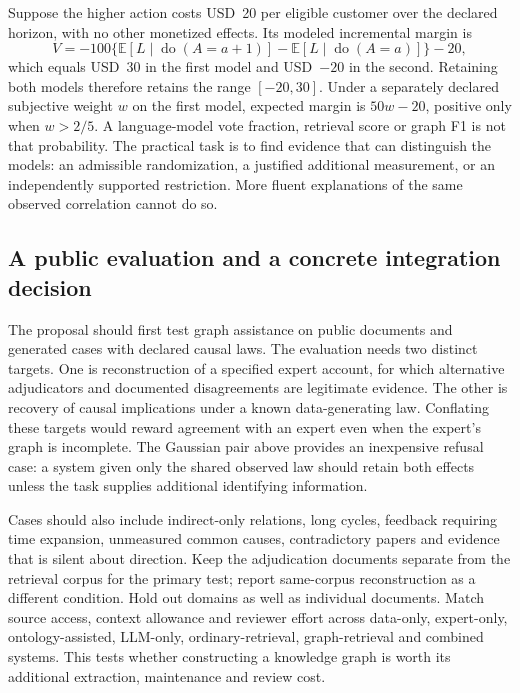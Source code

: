 Suppose the higher action costs USD~20 per eligible customer over the declared
horizon, with no other monetized effects. Its modeled incremental margin is
\begin{equation}
 V=-100\{\mathbb E[L\mid\operatorname{do}(A=a+1)]
             -\mathbb E[L\mid\operatorname{do}(A=a)]\}-20,
 \label{exec22:domain-margin}
\end{equation}
which equals USD~30 in the first model and USD~\(-20\) in the second. Retaining
both models therefore retains the range \([-20,30]\). Under a separately declared
subjective weight \(w\) on the first model, expected margin is \(50w-20\),
positive only when \(w>2/5\). A language-model vote fraction, retrieval score or
graph F1 is not that probability. The practical task is to find evidence that
can distinguish the models: an admissible randomization, a justified additional
measurement, or an independently supported restriction. More fluent explanations
of the same observed correlation cannot do so. \citep{exec22_domain_reference}

\subsection{A public evaluation and a concrete integration decision}
\label{exec22:domain-validation}

The proposal should first test graph assistance on public documents and generated
cases with declared causal laws. The evaluation needs two distinct targets.
One is reconstruction of a specified expert account, for which alternative
adjudicators and documented disagreements are legitimate evidence. The other is
recovery of causal implications under a known data-generating law. Conflating
these targets would reward agreement with an expert even when the expert's graph
is incomplete. The Gaussian pair above provides an inexpensive refusal case:
a system given only the shared observed law should retain both effects unless
the task supplies additional identifying information.

Cases should also include indirect-only relations, long cycles, feedback requiring
time expansion, unmeasured common causes, contradictory papers and evidence that
is silent about direction. Keep the adjudication documents separate from the
retrieval corpus for the primary test; report same-corpus reconstruction as a
different condition. Hold out domains as well as individual documents. Match
source access, context allowance and reviewer effort across data-only,
expert-only, ontology-assisted, LLM-only, ordinary-retrieval, graph-retrieval and
combined systems. This tests whether constructing a knowledge graph is worth its
additional extraction, maintenance and review cost.

